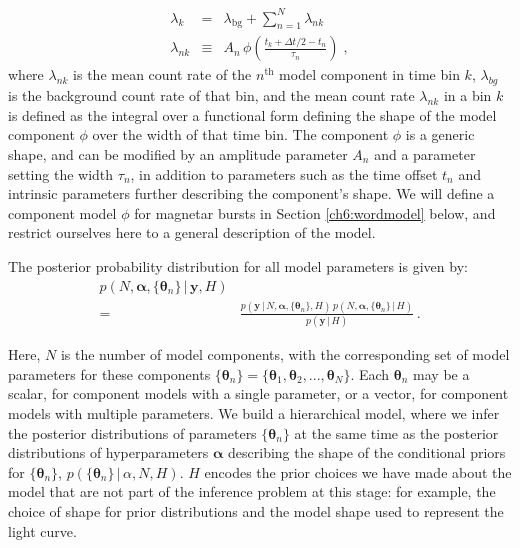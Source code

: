 \documentclass[12pt]{emulateapj}
\newcommand{\given}{\,|\,}
\newcommand{\counts}{y}
\newcommand{\pars}{\theta}
\newcommand{\mean}{\lambda}
\newcommand{\Poisson}{{\mathcal P}}
\newcommand{\bg}{\mathrm{bg}}
\newcommand{\word}{\phi}
\begin{document}
\begin{eqnarray}
\mean_k &=& \mean_{\bg} + \sum_{n=1}^N \mean_{nk}
\\
\mean_{nk} &\equiv& A_n\,\word\left(\frac{t_k+\Delta t/2-t_n}{\tau_n}\right) \; ,
\end{eqnarray}
where $\mean_{nk}$ is the mean count rate of the $n^{\mathrm{th}}$ model component in time bin $k$, 
$\mean_{bg}$ is the background count rate of that bin,
and the mean count rate $\mean_{nk}$ in a bin $k$ is defined as the integral over a functional form defining the shape of
the model component $\word$ over the width of that time bin. The component $\word$ is a generic shape,
and can be modified by an amplitude parameter $A_n$ and a parameter setting the width $\tau_n$, in addition to
parameters such as the time offset $t_n$ and intrinsic parameters further describing the component's shape.
We will define a component model $\word$ for magnetar bursts in Section \ref{ch6:wordmodel} below, and
restrict ourselves here to a general description of the model.

The posterior probability distribution for all model parameters is given by:
\begin{eqnarray}
p(N, \bm{\alpha},\{\bm{\theta}_n \} \given \bm{\counts}, H) &   \\\nonumber
 						 = & \frac{p(\bm{\counts} \given N, \bm{\alpha}, \{\bm{\theta}_n \}, H)\, p(N, \bm{\alpha}, \{\bm{\theta}_n \} \given H)}{p(\bm{\counts} \given H)} \, .
\end{eqnarray}

Here, $N$ is the number of model components, with the corresponding set of model parameters for these components $\{\bm{\theta}_n\} = \{ \bm{\theta}_1, \bm{\theta}_2, ..., \bm{\theta}_N \}$. Each $\bm{\theta}_n$ may be a scalar, for component models with a single parameter, or a vector, for component models with multiple parameters. 
We build a hierarchical model, where we infer the posterior distributions of parameters $\{\bm{\theta}_n\}$ at the same time as the posterior distributions of hyperparameters $\bm{\alpha}$ describing the shape
of the conditional priors for  $\{\bm{\theta}_n\}$, $p(\{\bm{\theta}_n\}\given \alpha, N, H)$.
$H$ encodes the prior choices we have
made about the model that are not part of the inference problem at this stage: for example, the choice of shape for prior distributions and the model shape used to represent the light curve.
\end{document}
